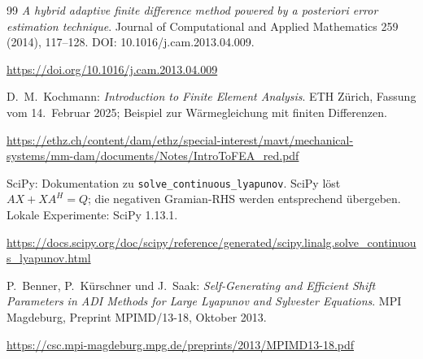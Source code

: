 \documentclass[11pt,a4paper]{article}
\begin{document}
\begin{thebibliography}{99}
 \emph{A hybrid adaptive finite difference method powered by a posteriori error estimation technique}. Journal of Computational and Applied Mathematics 259 (2014), 117--128. DOI: 10.1016/j.cam.2013.04.009.\par
\url{https://doi.org/10.1016/j.cam.2013.04.009}

 D.~M.~Kochmann: \emph{Introduction to Finite Element Analysis}. ETH Zürich, Fassung vom 14.~Februar 2025; Beispiel zur Wärmegleichung mit finiten Differenzen.\par
\url{https://ethz.ch/content/dam/ethz/special-interest/mavt/mechanical-systems/mm-dam/documents/Notes/IntroToFEA_red.pdf}

 SciPy: Dokumentation zu \texttt{solve\_continuous\_lyapunov}. SciPy löst $AX+XA^H=Q$; die negativen Gramian-RHS werden entsprechend übergeben. Lokale Experimente: SciPy 1.13.1.\par
\url{https://docs.scipy.org/doc/scipy/reference/generated/scipy.linalg.solve_continuous_lyapunov.html}

 P.~Benner, P.~Kürschner und J.~Saak: \emph{Self-Generating and Efficient Shift Parameters in ADI Methods for Large Lyapunov and Sylvester Equations}. MPI Magdeburg, Preprint MPIMD/13-18, Oktober 2013.\par
\url{https://csc.mpi-magdeburg.mpg.de/preprints/2013/MPIMD13-18.pdf}
\end{thebibliography}
\end{document}
